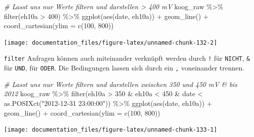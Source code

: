 \documentclass[
]{article}
\newenvironment{Shaded}{\begin{snugshade}}{\end{snugshade}}
\newcommand{\AttributeTok}[1]{\textcolor[rgb]{0.77,0.63,0.00}{#1}}
\newcommand{\CommentTok}[1]{\textcolor[rgb]{0.56,0.35,0.01}{\textit{#1}}}
\newcommand{\DecValTok}[1]{\textcolor[rgb]{0.00,0.00,0.81}{#1}}
\newcommand{\FunctionTok}[1]{\textcolor[rgb]{0.00,0.00,0.00}{#1}}
\newcommand{\NormalTok}[1]{#1}
\newcommand{\SpecialCharTok}[1]{\textcolor[rgb]{0.00,0.00,0.00}{#1}}
\newcommand{\StringTok}[1]{\textcolor[rgb]{0.31,0.60,0.02}{#1}}
\begin{document}
\begin{Shaded}
\begin{Highlighting}[]
\CommentTok{\# Lasst uns nur Werte filtern und darstellen \textgreater{} 400 mV}
\NormalTok{koog\_raw }\SpecialCharTok{\%\textgreater{}\%}
  \FunctionTok{filter}\NormalTok{(eh10a }\SpecialCharTok{\textgreater{}} \DecValTok{400}\NormalTok{) }\SpecialCharTok{\%\textgreater{}\%}
  \FunctionTok{ggplot}\NormalTok{(}\FunctionTok{aes}\NormalTok{(date, eh10a)) }\SpecialCharTok{+}
  \FunctionTok{geom\_line}\NormalTok{() }\SpecialCharTok{+}
  \FunctionTok{coord\_cartesian}\NormalTok{(}\AttributeTok{ylim =} \FunctionTok{c}\NormalTok{(}\DecValTok{100}\NormalTok{, }\DecValTok{800}\NormalTok{))}
\end{Highlighting}
\end{Shaded}

\begin{center}\texttt{[image: documentation\_files/figure-latex/unnamed-chunk-132-2]} \end{center}

\texttt{filter} Anfragen können auch miteinander verknüpft werden durch \texttt{!} für \texttt{NICHT}, \texttt{\&} für \texttt{UND}, \texttt{\textbar{}} für \texttt{ODER}. Die Bedingungen lassen sich durch ein \texttt{,} voneinander trennen.

\begin{Shaded}
\begin{Highlighting}[]
\CommentTok{\# Lasst uns nur Werte filtern und darstellen zwischen 350 und 450 mV \& bis 2012}
\NormalTok{koog\_raw }\SpecialCharTok{\%\textgreater{}\%}
  \FunctionTok{filter}\NormalTok{(eh10a }\SpecialCharTok{\textgreater{}} \DecValTok{350} \SpecialCharTok{\&}\NormalTok{ eh10a }\SpecialCharTok{\textless{}} \DecValTok{450} \SpecialCharTok{\&}\NormalTok{ date }\SpecialCharTok{\textless{}} \FunctionTok{as.POSIXct}\NormalTok{(}\StringTok{"2012{-}12{-}31 23:00:00"}\NormalTok{)) }\SpecialCharTok{\%\textgreater{}\%}
  \FunctionTok{ggplot}\NormalTok{(}\FunctionTok{aes}\NormalTok{(date, eh10a)) }\SpecialCharTok{+}
  \FunctionTok{geom\_line}\NormalTok{() }\SpecialCharTok{+}
  \FunctionTok{coord\_cartesian}\NormalTok{(}\AttributeTok{ylim =} \FunctionTok{c}\NormalTok{(}\DecValTok{100}\NormalTok{, }\DecValTok{800}\NormalTok{))}
\end{Highlighting}
\end{Shaded}

\begin{center}\texttt{[image: documentation\_files/figure-latex/unnamed-chunk-133-1]} \end{center}
\end{document}
